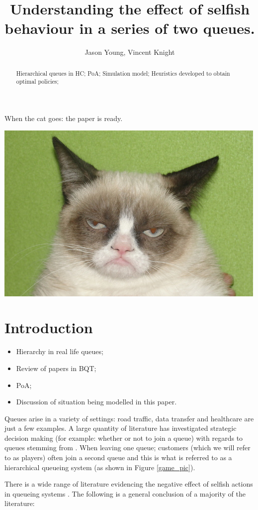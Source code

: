 \documentclass[12pt]{article}
\title{Understanding the effect of selfish behaviour in a series of two queues.}
\author{Jason Young, Vincent Knight}
\begin{document}
When the cat goes: the paper is ready.

\begin{center}
  \includegraphics[width=.5\textwidth]{Images/cat.jpg}
\end{center}

\maketitle

\begin{abstract}

Hierarchical queues in HC;
PoA;
Simulation model;
Heuristics developed to obtain optimal policies;

\end{abstract}

\section{Introduction}\label{Introduction}

\begin{itemize}
    \item Hierarchy in real life queues;
    \item Review of papers in BQT;
    \item PoA;
    \item Discussion of situation being modelled in this paper.
\end{itemize}

Queues arise in a variety of settings: road traffic, data transfer and healthcare are just a few examples.
A large quantity of literature has investigated strategic decision making (for example: whether or not to join a queue) with regards to queues stemming from \cite{}.
When leaving one queue; customers (which we will refer to as players) often join a second queue and this is what is referred to as a hierarchical queueing system (as shown in Figure \ref{game_pic}).

There is a wide range of literature evidencing the negative effect of selfish actions in queueing systems \cite{}.
The following is a general conclusion of a majority of the literature:
\end{document}
